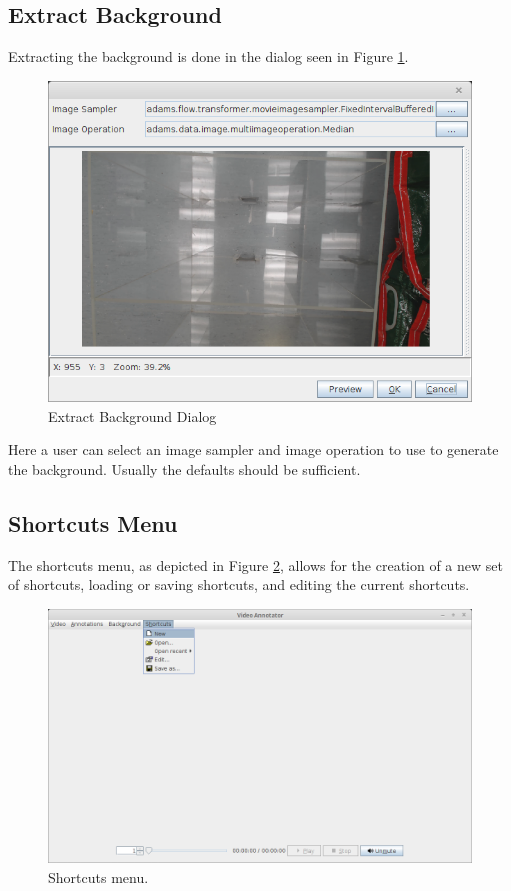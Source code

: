 \documentclass[a4paper]{book}
\begin{document}
\subsection{Extract Background}
Extracting the background is done in the dialog seen in Figure \ref{AnnotatorExtractBackground}.

\begin{figure}[htb]
  \centering
  \includegraphics[width=12.0cm]{images/AnnotatorExtractBackground.png}
  \caption{Extract Background Dialog}
  \label{AnnotatorExtractBackground}
\end{figure}

Here a user can select an image sampler and image operation to use to generate the background. Usually the defaults
should be sufficient.

\subsection{Shortcuts Menu}
The shortcuts menu, as depicted in Figure \ref{AnnotatorShortcutsMenu}, allows
for the creation of a new set of shortcuts, loading or saving shortcuts, and
editing the current shortcuts.

\begin{figure}[htb]
  \centering
  \includegraphics[width=12.0cm]{images/AnnotatorShortcutsMenu.png}
  \caption{Shortcuts menu.}
  \label{AnnotatorShortcutsMenu}
\end{figure}
\end{document}
